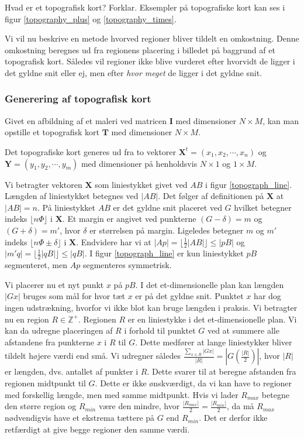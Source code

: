 {
Hvad er et topografisk kort? Forklar. Eksempler på topografiske kort kan
ses i figur \ref{topography_plus} og \ref{topography_times}.

Vi vil nu beskrive en metode hvorved regioner bliver tildelt en
omkostning. Denne omkostning beregnes ud fra regionens placering i
billedet på baggrund af et topografisk kort. Således vil regioner ikke
blive vurderet efter hvorvidt de ligger i det gyldne snit eller ej, men
efter \emph{hvor meget} de ligger i det gyldne snit.

\subsubsection*{Generering af topografisk kort}

Givet en afbildning af et maleri ved matricen $\mathbf{I}$ med dimensioner
$N \times{} M$, kan man opstille et topografisk kort $\mathbf{T}$ med dimensioner
$N \times{} M$.

Det topografiske kort generes ud fra to vektorer $\mathbf{X}^t =
\left(x_1, x_2, \cdots, x_n\right)$ og $\mathbf{Y} = \left(y_1, y_2,
\cdots, y_m\right)$ med dimensioner på henholdsvis $N \times 1$ og $1
\times M$.

Vi betragter vektoren $\mathbf{X}$ som liniestykket givet ved $AB$ i
figur \ref{topograph_line}. Længden af liniestykket betegnes ved $|AB|$.
Det følger af definitionen på $\mathbf{X}$ at $|AB| = n$. På liniestykket $AB$
er det gyldne snit placeret ved $G$ hvilket betegner indeks $\lfloor
n\varPhi \rfloor$ i $\mathbf{X}$. Et margin er angivet ved punkterne $(G
- \delta) = m$ og $(G + \delta) = m'$, hvor $\delta$ er størrelsen på
margin. Ligeledes betegner $m$ og $m'$ indeks $\lfloor n \varPhi \pm
\delta \rfloor$ i $\mathbf{X}$.  Endvidere har vi at $|Ap| = \lfloor
\frac{1}{2}|AB| \rfloor \leq |pB|$ og $|m'q| = \lfloor \frac{1}{2}|qB|
\rfloor \leq |qB|$. I figur \ref{topograph_line} er kun liniestykket
$pB$ segmenteret, men $Ap$ segmenteres symmetrisk.

Vi placerer nu et nyt punkt $x$ på $pB$. I det et-dimensionelle plan kan
længden $|Gx|$ bruges som mål for hvor tæt $x$ er på det gyldne snit.
Punktet $x$ har dog ingen udstrækning, hvorfor vi ikke blot kan bruge
længden i praksis. Vi betragter nu en region $R \in \mathbb{Z}^{+}$.
Regionen $R$ er en liniestykke i det et-dimensionelle plan. Vi kan da
udregne placeringen af $R$ i forhold til punktet $G$ ved at summere alle
afstandene fra punkterne $x$ i $R$ til $G$.  Dette medfører at lange
liniestykker bliver tildelt højere værdi end små. Vi udregner således
$\frac{\sum_{x \in R}{|Gx|}}{|R|} = |G(\frac{|R|}{2})|$, hvor $|R|$ er
længden, dvs. antallet af punkter i $R$. Dette svarer til at beregne
afstanden fra regionen midtpunkt til $G$. Dette er ikke ønskværdigt, da
vi kan have to regioner med forskellig længde, men med samme midtpunkt.
Hvis vi lader $R_{max}$ betegne den større region og $R_{min}$ være den
mindre, hvor $ \frac{|R_{max}|}{2} = \frac{|R_{min}|}{2}$, da må
$R_{max}$ nødvendigvis have et ekstrema tættere på $G$ end $R_{min}$.
Det er derfor ikke retfærdigt at give begge regioner den samme værdi.

}
